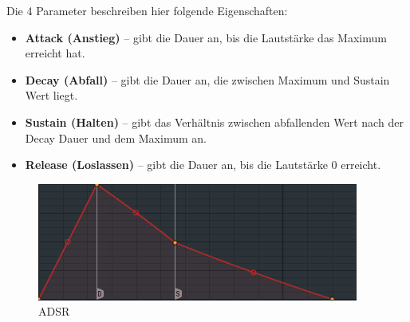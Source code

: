 \bigskip

Die 4 Parameter beschreiben hier folgende Eigenschaften:

\medskip

\begin{itemize}
	\item \textbf{Attack (Anstieg)} -- gibt die Dauer an, bis die Lautstärke das Maximum erreicht hat.
	\item \textbf{Decay (Abfall)} -- gibt die Dauer an, die zwischen Maximum und Sustain Wert liegt.
	\item \textbf{Sustain (Halten)} -- gibt das Verhältnis zwischen abfallenden Wert nach der Decay Dauer und dem Maximum an.
	\item \textbf{Release (Loslassen)} -- gibt die Dauer an, bis die Lautstärke 0 erreicht.
\end{itemize}


\bigskip

\begin{figure}[htbp] \centering
	\includegraphics[width=.95\linewidth]{images/ADSR.png}
	\caption{ADSR}
	\label{ADSR}
\end{figure}

